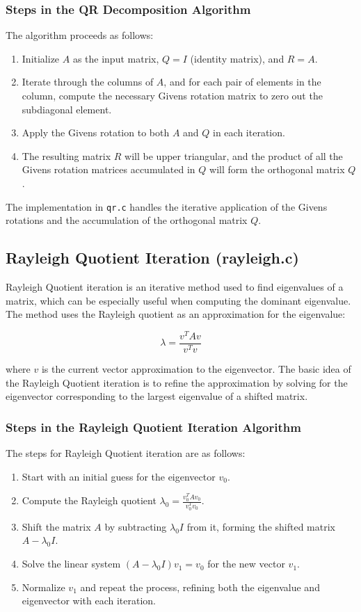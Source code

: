 \documentclass[a4paper,12pt]{article}
\theoremstyle{remark}
\begin{document}
\subsubsection{Steps in the QR Decomposition Algorithm}
The algorithm proceeds as follows:
\begin{enumerate}
    \item Initialize \( A \) as the input matrix, \( Q = I \) (identity matrix), and \( R = A \).
    \item Iterate through the columns of \( A \), and for each pair of elements in the column, compute the necessary Givens rotation matrix to zero out the subdiagonal element.
    \item Apply the Givens rotation to both \( A \) and \( Q \) in each iteration.
    \item The resulting matrix \( R \) will be upper triangular, and the product of all the Givens rotation matrices accumulated in \( Q \) will form the orthogonal matrix \( Q \).
\end{enumerate}

The implementation in \texttt{qr.c} handles the iterative application of the Givens rotations and the accumulation of the orthogonal matrix \( Q \).

\subsection{Rayleigh Quotient Iteration (rayleigh.c)}
Rayleigh Quotient iteration is an iterative method used to find eigenvalues of a matrix, which can be especially useful when computing the dominant eigenvalue. The method uses the Rayleigh quotient as an approximation for the eigenvalue:

\[
\lambda = \frac{v^T A v}{v^T v}
\]

where \( v \) is the current vector approximation to the eigenvector. The basic idea of the Rayleigh Quotient iteration is to refine the approximation by solving for the eigenvector corresponding to the largest eigenvalue of a shifted matrix.

\subsubsection{Steps in the Rayleigh Quotient Iteration Algorithm}
The steps for Rayleigh Quotient iteration are as follows:
\begin{enumerate}
    \item Start with an initial guess for the eigenvector \( v_0 \).
    \item Compute the Rayleigh quotient \( \lambda_0 = \frac{v_0^T A v_0}{v_0^T v_0} \).
    \item Shift the matrix \( A \) by subtracting \( \lambda_0 I \) from it, forming the shifted matrix \( A - \lambda_0 I \).
    \item Solve the linear system \( (A - \lambda_0 I) v_1 = v_0 \) for the new vector \( v_1 \).
    \item Normalize \( v_1 \) and repeat the process, refining both the eigenvalue and eigenvector with each iteration.
\end{enumerate}
\end{document}
